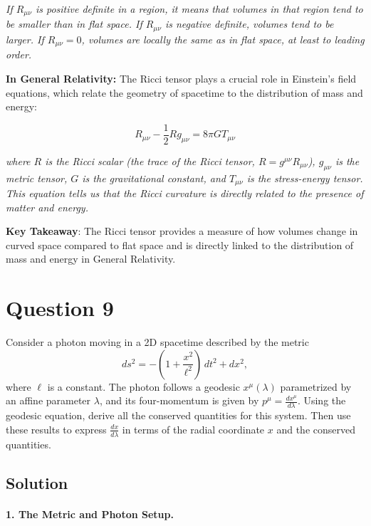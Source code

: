 \documentclass{article}
\begin{document}
\textit{If \(R_{\mu\nu}\) is positive definite in a region, it means that volumes in that region tend to be smaller than in flat space. If \(R_{\mu\nu}\) is negative definite, volumes tend to be larger. If \(R_{\mu\nu} = 0\), volumes are locally the same as in flat space, at least to leading order.}

\textbf{In General Relativity:} The Ricci tensor plays a crucial role in Einstein's field equations, which relate the geometry of spacetime to the distribution of mass and energy:

\[
R_{\mu\nu} - \frac{1}{2} R g_{\mu\nu} = 8\pi G T_{\mu\nu}
\]

\textit{where \(R\) is the Ricci scalar (the trace of the Ricci tensor, \(R = g^{\mu\nu}R_{\mu\nu}\)), \(g_{\mu\nu}\) is the metric tensor, \(G\) is the gravitational constant, and \(T_{\mu\nu}\) is the stress-energy tensor. This equation tells us that the Ricci curvature is directly related to the presence of matter and energy.}

\textbf{Key Takeaway}: The Ricci tensor provides a measure of how volumes change in curved space compared to flat space and is directly linked to the distribution of mass and energy in General Relativity.

\pagebreak

\section*{Question 9}

Consider a photon moving in a 2D spacetime described by the metric
\begin{equation*}
ds^2 = -\left(1 + \frac{x^2}{\ell^2}\right)\,dt^2 + dx^2,
\end{equation*}
where \(\ell\) is a constant. The photon follows a geodesic \(x^\mu(\lambda)\) parametrized by an affine parameter \(\lambda\), and its four-momentum is given by \(p^\mu = \frac{dx^\mu}{d\lambda}\). Using the geodesic equation, derive all the conserved quantities for this system. Then use these results to express \(\frac{dx}{d\lambda}\) in terms of the radial coordinate \(x\) and the conserved quantities.

\subsection*{Solution}

\paragraph{1. The Metric and Photon Setup.}
\end{document}
